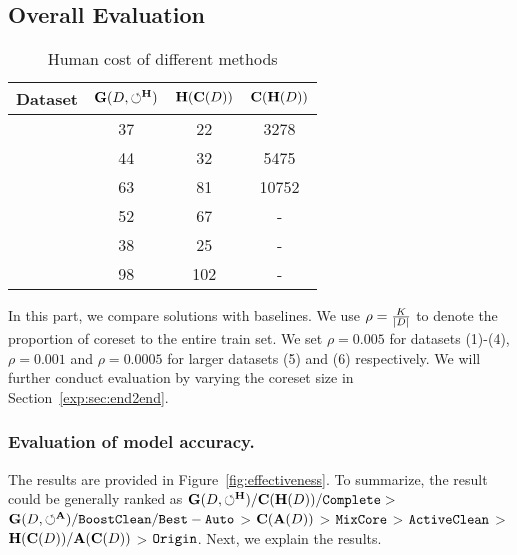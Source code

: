 


\subsection{Overall Evaluation}\label{exp:sec:overall}

\begin{table}
	\centering
	\caption{Human cost of different methods}
	\vspace{-1.2em}
	\small
	\begin{tabular}{cccc}
		\hline
		Dataset & $\mathbf{G}(D,\circlearrowleft^\mathbf{H})$ & $\mathbf{H}(\mathbf{C}(D))$ & $\mathbf{C}(\mathbf{H}(D))$\\
		\hline
		\nursery & 37 & 22 & 3278\\
		\hr & 44 & 32 & 5475\\
		\adult & 63 & 81 & 10752\\
		\credit & 52 & 67 & -\\
		\bike & 38 & 25 & -\\
		\air & 98 & 102 & -\\
		\hline
	\end{tabular}
	\label{tbl:humancost}
	\vspace{-1em}
\end{table}





In this part, we compare \ours solutions with baselines. We use $\rho = \frac{K}{|D|}$ to denote the proportion of coreset  to the entire train set.  %
We set  $\rho=0.005$ for datasets (1)-(4), $\rho=0.001$ and  $\rho=0.0005$ for larger datasets (5) and (6) respectively.
 We  will further  conduct evaluation by varying the coreset size  in Section~\ref{exp:sec:end2end}.









\subsubsection{Evaluation of model accuracy.}
The results are provided in Figure~\ref{fig:effectiveness}. To summarize, the result could be generally ranked as $\mathbf{G}(D,\circlearrowleft^\mathbf{H})/\mathbf{C}(\mathbf{H}(D))/{\tt Complete} > $ $\mathbf{G}(D,\circlearrowleft^\mathbf{A})/{\tt BoostClean} /{\tt Best-Auto} $ > $\mathbf{C}(\mathbf{A}(D))$ > ${\tt MixCore}$ > ${\tt ActiveClean}$ > $\mathbf{H}(\mathbf{C}(D))/\mathbf{A}(\mathbf{C}(D))$ > ${\tt Origin}$.
Next, we explain the results.

